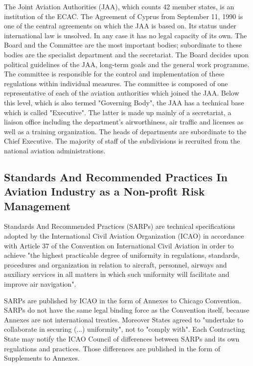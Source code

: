 \documentclass[a4paper, 10pt]{article}
\begin{document}
The Joint Aviation Authorities (JAA), which counts 42 member states, is an institution of the
ECAC. The Agreement of Cyprus from September 11, 1990 is one of the central 
agreements on which the JAA is based on. Its status under international law is unsolved. 
In any case it has no legal capacity of its own. The Board
and the Committee are the most important bodies; subordinate to these bodies are the specialist
department and the secretariat.
The Board decides upon political guidelines of the JAA, long-term goals and the general work
programme. The committee is responsible for the control and implementation of these regulations
within individual measures. The committee is composed of one representative of each of
the aviation authorities which joined the JAA. Below this level,
which is also termed "Governing Body", the JAA has a technical base which is called "Executive".
The latter is made up mainly of a secretariat, a liaison office including
the department's airworthiness, air traffic and licenses as well as a training organization. The
heads of departments are subordinate to the Chief Executive. The majority of staff of the subdivisions
is recruited from the national aviation administrations.

\subsection{Standards And Recommended Practices In Aviation Industry as a Non-profit Risk Management}
Standards And Recommended Practices (SARPs) are technical specifications adopted by the International Civil Aviation Organization (ICAO) in accordance with Article 37 of the Convention on International Civil Aviation in order to achieve "the highest practicable degree of uniformity in regulations, standards, procedures and organization in relation to aircraft, personnel, airways and auxiliary services in all matters in which such uniformity will facilitate and improve air navigation".\par

SARPs are published by ICAO in the form of Annexes to Chicago Convention. SARPs do not have the same legal binding force as the Convention itself, because Annexes are not international treaties. Moreover States agreed to "undertake to collaborate in securing (...) uniformity", not to "comply with". Each Contracting State may notify the ICAO Council of differences between SARPs and its own regulations and practices. Those differences are published in the form of Supplements to Annexes.\par
\end{document}
